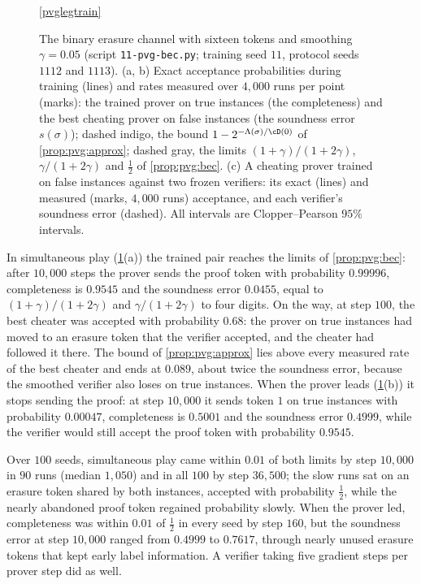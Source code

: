 \begin{refsection}
\begin{figure}[t]
\begin{fullwidth}
\par\vspace{1mm}
\ref{pvglegtrain}
\end{fullwidth}
\caption{The binary erasure channel with sixteen tokens and smoothing $\gamma=0.05$ (script \texttt{11-pvg-bec.py}; training seed $11$, protocol seeds $1112$ and $1113$). (a, b) Exact acceptance probabilities during training (lines) and rates measured over $4{,}000$ runs per point (marks): the trained prover on true instances (the completeness) and the best cheating prover on false instances (the soundness error $s(\sigma)$); dashed indigo, the bound $1-2^{-\Lambda(\sigma)/\cD(0)}$ of \cref{prop:pvg:approx}; dashed gray, the limits $(1+\gamma)/(1+2\gamma)$, $\gamma/(1+2\gamma)$ and $\frac12$ of \cref{prop:pvg:bec}. (c) A cheating prover trained on false instances against two frozen verifiers: its exact (lines) and measured (marks, $4{,}000$ runs) acceptance, and each verifier's soundness error (dashed). All intervals are Clopper--Pearson $95\%$ intervals.}\label{fig:pvg:runs}
\end{figure}

In simultaneous play (\cref{fig:pvg:runs}(a)) the trained pair reaches the limits of \cref{prop:pvg:bec}: after $10{,}000$ steps the prover sends the proof token with probability $0.99996$, completeness is $0.9545$ and the soundness error $0.0455$, equal to $(1+\gamma)/(1+2\gamma)$ and $\gamma/(1+2\gamma)$ to four digits. On the way, at step $100$, the best cheater was accepted with probability $0.68$: the prover on true instances had moved to an erasure token that the verifier accepted, and the cheater had followed it there. The bound of \cref{prop:pvg:approx} lies above every measured rate of the best cheater and ends at $0.089$, about twice the soundness error, because the smoothed verifier also loses on true instances. When the prover leads (\cref{fig:pvg:runs}(b)) it stops sending the proof: at step $10{,}000$ it sends token $1$ on true instances with probability $0.00047$, completeness is $0.5001$ and the soundness error $0.4999$, while the verifier would still accept the proof token with probability $0.9545$.

Over $100$ seeds, simultaneous play came within $0.01$ of both limits by step $10{,}000$ in $90$ runs (median $1{,}050$) and in all $100$ by step $36{,}500$; the slow runs sat on an erasure token shared by both instances, accepted with probability $\frac12$, while the nearly abandoned proof token regained probability slowly. When the prover led, completeness was within $0.01$ of $\frac12$ in every seed by step $160$, but the soundness error at step $10{,}000$ ranged from $0.4999$ to $0.7617$, through nearly unused erasure tokens that kept early label information. A verifier taking five gradient steps per prover step did as well.


\end{refsection}
